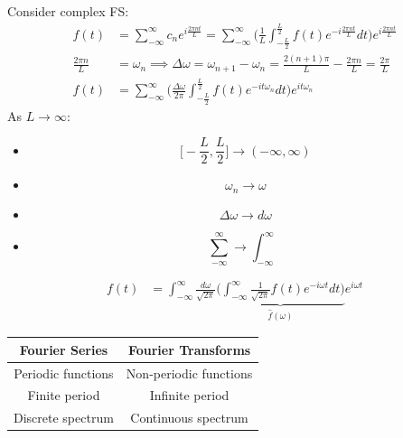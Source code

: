 \documentclass[a4paper, 11pt, normalem]{report}
\newcommand\ifnt{\int_{-\infty}^{\infty}}
\newcommand\ifsum{\sum_{-\infty}^{\infty}}
\newcommand\om{\omega}
\begin{document}
Consider complex FS:
\begin{align*}
    f(t) &= \ifsum c_n e^{i\tfrac{2\pi nt}{L}} = \ifsum \Bigg(\frac{1}{L}\int_{-\tfrac{L}{2}}^{\tfrac{L}{2}} f(t)e^{-i\tfrac{2\pi nt}{L}}dt \Bigg)e^{i\tfrac{2\pi nt}{L}} \\
    \frac{2\pi n}{L} &= \om_n \implies \Delta \om = \om_{n + 1} - \om_n = \frac{2(n + 1)\pi}{L} - \frac{2\pi n}{L} = \frac{2\pi}{L} \\
    f(t) &= \ifsum \Bigg(\frac{\Delta \om}{2\pi} \int_{-\tfrac{L}{2}}^{\tfrac{L}{2}} f(t)e^{-it\om_n}dt\Bigg) e^{it\om_n}
\end{align*}
As $L \to \infty$:
\begin{itemize}
    \item   \begin{equation*}
                \Big[-\frac{L}{2},\frac{L}{2}\Big] \to (-\infty, \infty)
            \end{equation*}
    \item   \begin{equation*}
                \om_n \to \om
            \end{equation*}
    \item   \begin{equation*}
                \Delta \om \to d\om
            \end{equation*}
    \item   \begin{equation*}
                \ifsum \to \ifnt
            \end{equation*}
\end{itemize}
\begin{align*}
    f(t) &= \ifnt \frac{d\om}{\sqrt{2\pi}}\underbrace{\Bigg(\ifnt \frac{1}{\sqrt{2\pi}} f(t)e^{-i\om t} dt\Bigg)}_{\hat{f}(\om)} e^{i\om t}
\end{align*}
\begin{table}[H]
    \centering
    \begin{tabular}{|c|c|}
        \hline
            Fourier Series &     Fourier Transforms \\
        \hline
        Periodic functions & Non-periodic functions \\
             Finite period &        Infinite period \\
         Discrete spectrum &    Continuous spectrum \\
        \hline
    \end{tabular}
\end{table}
\end{document}
